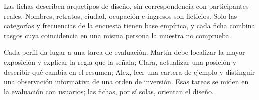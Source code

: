 \label{annex:personas}

Las fichas describen arquetipos de diseño, sin correspondencia con participantes reales. Nombres, retratos, ciudad, ocupación e ingresos son ficticios. Solo las categorías y frecuencias de la encuesta tienen base empírica, y cada ficha combina rasgos cuya coincidencia en una misma persona la muestra no comprueba.



Cada perfil da lugar a una tarea de evaluación. Martín debe localizar la mayor exposición y explicar la regla que la señala; Clara, actualizar una posición y describir qué cambia en el resumen; Alex, leer una cartera de ejemplo y distinguir una observación informativa de una orden de inversión. Esas tareas se miden en la evaluación con usuarios; las fichas, por sí solas, orientan el diseño.


\FloatBarrier

